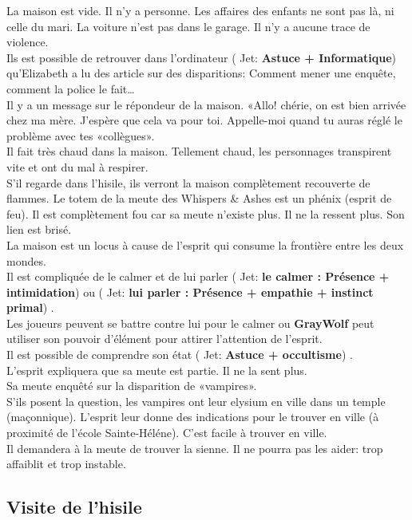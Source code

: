 \documentclass[oneside,12pt]{book}
\newcommand\roll[1]{
( Jet: \textbf{#1})
}
\newcommand{\Glen}{\textbf{GrayWolf} }
\begin{document}
\begin{flushleft}
La maison est vide. Il n’y a personne. Les affaires des enfants ne sont pas là, ni celle du mari. La voiture n’est pas dans le garage. Il n’y a aucune trace de violence. \\ Ils est possible de retrouver dans l’ordinateur \roll{ Astuce + Informatique} qu’Elizabeth a lu des article sur des disparitions: Comment mener une enquête, comment la police le fait…\\
Il y a un message sur le répondeur de la maison. «Allo! chérie, on est bien arrivée chez ma mère. J’espère que cela va pour toi. Appelle-moi quand tu auras réglé le problème avec tes «collègues».\\
Il fait très chaud dans la maison. Tellement chaud, les personnages transpirent vite et ont du mal à respirer.\\
S’il regarde dans l’hisile, ils verront la maison complètement recouverte de flammes. 
Le totem de la meute des Whispers \& Ashes est un phénix (esprit de feu). Il est complètement fou car sa meute n’existe plus. Il ne la ressent plus. Son lien est brisé. \\
La maison est un locus à cause de l’esprit qui consume la frontière entre les deux mondes.\\
Il est compliquée de le calmer et de lui parler \roll{le calmer : Présence + intimidation} ou \roll{lui parler : Présence + empathie + instinct primal}. \\
Les joueurs peuvent se battre contre lui pour le calmer ou \Glen peut utiliser son pouvoir d’élément pour attirer l’attention de l’esprit.\\
Il est possible de comprendre son état \roll{ Astuce + occultisme}.\\
L’esprit expliquera que sa meute est partie. Il ne la sent plus.\\ Sa meute enquêté sur la disparition de «vampires».\\
S’ils posent la question, les vampires ont leur elysium en ville dans un temple (maçonnique). L’esprit leur donne des indications pour le trouver en ville (à proximité de l’école Sainte-Héléne). C’est facile à trouver en ville.\\
Il demandera à la meute de trouver la sienne. Il ne pourra pas les aider: trop affaiblit et trop instable.\\

\subsection{Visite de l’hisile}


\end{flushleft}
\end{document}
